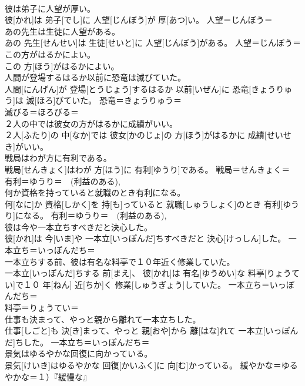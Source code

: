 \documentclass[8pt]{extreport}
\begin{document}
\begin{CJK}{UTF8}{min}
\\	彼は弟子に人望が厚い。	
\\	彼[かれ]は 弟子[でし]に 人望[じんぼう]が 厚[あつ]い。	人望＝じんぼう＝ 
\\	あの先生は生徒に人望がある。	
\\	あの 先生[せんせい]は 生徒[せいと]に 人望[じんぼう]がある。	人望＝じんぼう＝ 
\\	この方がはるかによい。	
\\	この 方[ほう]がはるかによい。	
\\	人間が登場するはるか以前に恐竜は滅びていた。	
\\	人間[にんげん]が 登場[とうじょう]するはるか 以前[いぜん]に 恐竜[きょうりゅう]は 滅[ほろ]びていた。	恐竜＝きょうりゅう＝ 
\\	滅びる＝ほろびる＝ 
\\	２人の中では彼女の方がはるかに成績がいい。	
\\	２人[ふたり]の 中[なか]では 彼女[かのじょ]の 方[ほう]がはるかに 成績[せいせき]がいい。	
\\	戦局はわが方に有利である。	
\\	戦局[せんきょく]はわが 方[ほう]に 有利[ゆうり]である。	戦局＝せんきょく＝ 
\\	有利＝ゆうり＝　(利益のある), 
\\	何か資格を持っていると就職のとき有利になる。	
\\	何[なに]か 資格[しかく]を 持[も]っていると 就職[しゅうしょく]のとき 有利[ゆうり]になる。	有利＝ゆうり＝　(利益のある), 
\\	彼は今や一本立ちすべきだと決心した。	
\\	彼[かれ]は 今[いま]や 一本立[いっぽんだ]ちすべきだと 決心[けっしん]した。	一本立ち＝いっぽんだち＝ 
\\	一本立ちする前、彼は有名な料亭で１０年近く修業していた。	
\\	一本立[いっぽんだ]ちする 前[まえ]、 彼[かれ]は 有名[ゆうめい]な 料亭[りょうてい]で１０ 年[ねん] 近[ちか]く 修業[しゅうぎょう]していた。	一本立ち＝いっぽんだち＝ 
\\	料亭＝りょうてい＝ 
\\	仕事も決まって、やっと親から離れて一本立ちした。	
\\	仕事[しごと]も 決[き]まって、やっと 親[おや]から 離[はな]れて 一本立[いっぽんだ]ちした。	一本立ち＝いっぽんだち＝ 
\\	景気はゆるやかな回復に向かっている。	
\\	景気[けいき]はゆるやかな 回復[かいふく]に 向[む]かっている。	緩やかな＝ゆるやかな＝１）『緩慢な』

\end{CJK}
\end{document}
